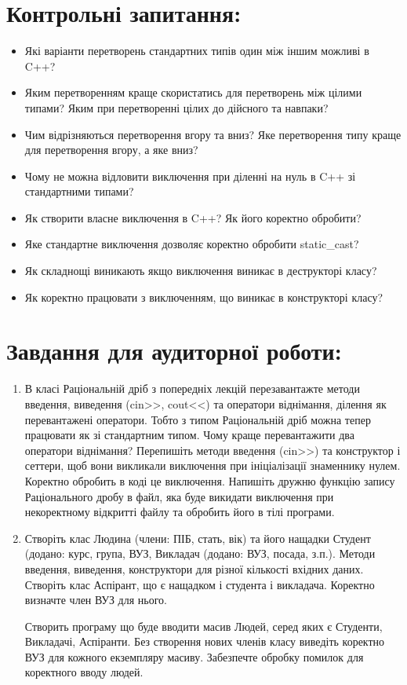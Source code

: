 \documentclass[a5paper,titlepage,openany,twoside,
]
{book_unv}%
\begin{document}
\section{Контрольні запитання:}
\begin{itemize}
\item
  Які варіанти перетворень стандартних типів один між іншим можливі в
  C++?
\item
  Яким перетворенням краще скористатись для перетворень між цілими
  типами? Яким при перетворенні цілих до дійсного та навпаки?
\item
  Чим відрізняються перетворення вгору та вниз? Яке перетворення типу
  краще для перетворення вгору, а яке вниз?
\item
  Чому не можна відловити виключення при діленні на нуль в C++ зі
  стандартними типами?
\item
  Як створити власне виключення в C++? Як його коректно обробити?
\item
  Яке стандартне виключення дозволяє коректно обробити static\_cast?
\item
  Як складнощі виникають якщо виключення виникає в деструкторі класу?
\item
  Як коректно працювати з виключенням, що виникає в конструкторі класу?
\end{itemize}

\section{Завдання для аудиторної роботи:}

\begin{enumerate}
\def\labelenumi{\arabic{enumi})}

\item
  В класі Раціональній дріб з попередніх лекцій перезавантажте методи
  введення, виведення (cin\textgreater{}\textgreater{},
  cout\textless{}\textless{}) та оператори віднімання, ділення як
  перевантажені оператори. Тобто з типом Раціональній дріб можна тепер
  працювати як зі стандартним типом. Чому краще перевантажити два
  оператори віднімання? Перепишіть методи введення
  (cin\textgreater{}\textgreater{}) та конструктор і сеттери, щоб вони
  викликали виключення при ініціалізації знаменнику нулем. Коректно
  обробить в коді це виключення. Напишіть дружню функцію запису
  Раціонального дробу в файл, яка буде викидати виключення при
  некоректному відкритті файлу та обробить його в тілі програми.

\item
  Створіть клас Людина (члени: ПІБ, стать, вік) та його нащадки
  Студент (додано: курс, група, ВУЗ, Викладач (додано: ВУЗ, посада,
  з.п.). Методи введення, виведення, конструктори для різної кількості
  вхідних даних. Створіть клас Аспірант, що є нащадком і студента і викладача.
 Коректно визначте член ВУЗ для нього. 

 Створить програму що буде вводити масив Людей, серед яких є Студенти,
Викладачі, Аспіранти. Без створення нових членів класу виведіть коректно
ВУЗ для кожного екземпляру масиву. Забезпечте обробку помилок для коректного вводу людей.
\end{enumerate}
\end{document}
